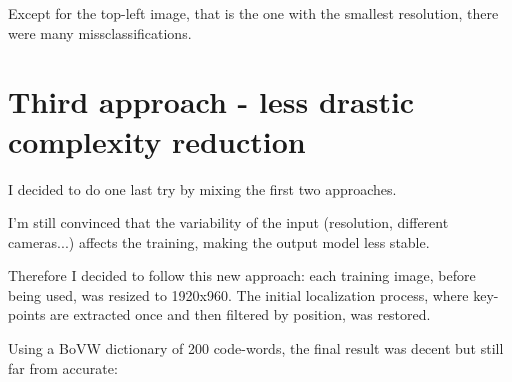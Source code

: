 \documentclass[]{report}
\begin{document}
\vspace{0.5cm}

Except for the top-left image, that is the one with the smallest resolution, there were many missclassifications.

\section{Third approach - less drastic complexity reduction}
I decided to do one last try by mixing the first two approaches.

I'm still convinced that the variability of the input (resolution, different cameras...) affects the training, making the output model less stable.

Therefore I decided to follow this new approach: each training image, before being used, was resized to 1920x960. The initial localization process, where key-points are extracted once and then filtered by position, was restored.

Using a BoVW dictionary of 200 code-words, the final result was decent but still far from accurate:

\vspace{0.5cm}
\end{document}
